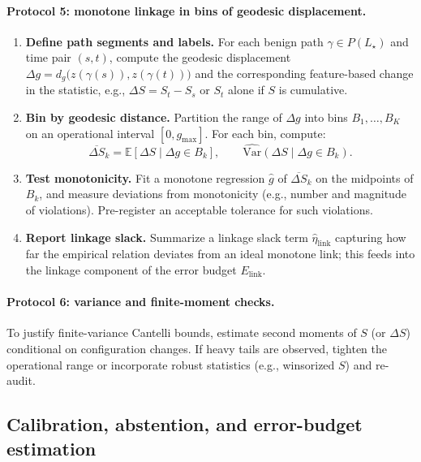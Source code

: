 \documentclass[11pt]{article}
\begin{document}
\paragraph{Protocol 5: monotone linkage in bins of geodesic displacement.}

\begin{enumerate}[label=(\arabic*)]
\item \textbf{Define path segments and labels.} For each benign path
  $\gamma \in P(L_\star)$ and time pair $(s,t)$, compute the geodesic
  displacement $\Delta g = d_g\bigl(z(\gamma(s)),z(\gamma(t))\bigr)$ and
  the corresponding feature-based change in the statistic, e.g.,
  $\Delta S = S_t - S_s$ or $S_t$ alone if $S$ is cumulative.
\item \textbf{Bin by geodesic distance.} Partition the range of $\Delta g$
  into bins $B_1,\dots,B_K$ on an operational interval
  $[0,g_{\max}]$. For each bin, compute:
  \[
  \overline{\Delta S}_k
  = \mathbb{E}[\Delta S \mid \Delta g \in B_k],\qquad
  \widehat{\mathrm{Var}}(\Delta S \mid \Delta g \in B_k).
  \]
\item \textbf{Test monotonicity.} Fit a monotone regression
  $\widehat{g}$ of $\overline{\Delta S}_k$ on the midpoints of $B_k$,
  and measure deviations from monotonicity (e.g., number and magnitude
  of violations). Pre-register an acceptable tolerance for such violations.
\item \textbf{Report linkage slack.} Summarize a linkage slack term
  $\widehat{\eta}_{\mathrm{link}}$ capturing how far the empirical relation
  deviates from an ideal monotone link; this feeds into the linkage
  component of the error budget $E_{\mathrm{link}}$.
\end{enumerate}

\paragraph{Protocol 6: variance and finite-moment checks.}

To justify finite-variance Cantelli bounds, estimate second moments of
$S$ (or $\Delta S$) conditional on configuration changes. If heavy tails
are observed, tighten the operational range or incorporate robust statistics
(e.g., winsorized $S$) and re-audit.

\subsection{Calibration, abstention, and error-budget estimation}
\end{document}

